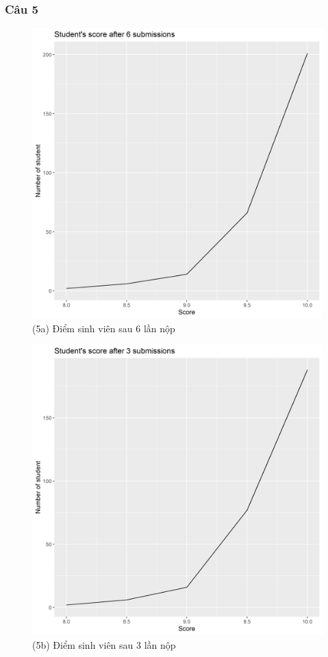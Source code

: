 \documentclass[a4paper]{article}
\theoremstyle{definition}
\begin{document}
\subsubsection{Câu 5}
\begin{figure}[!ht]
    \centering
    \includegraphics[scale=0.4]{Pics/q5a_file3.png}
    \caption{(5a) Điểm sinh viên sau 6 lần nộp}
    \label{fig:my_label}
\end{figure}
\begin{figure}[!ht]
    \centering
    \includegraphics[scale=0.4]{Pics/q5b_file3.png}
    \caption{(5b) Điểm sinh viên sau 3 lần nộp}
    \label{fig:my_label}
\end{figure}
\end{document}
